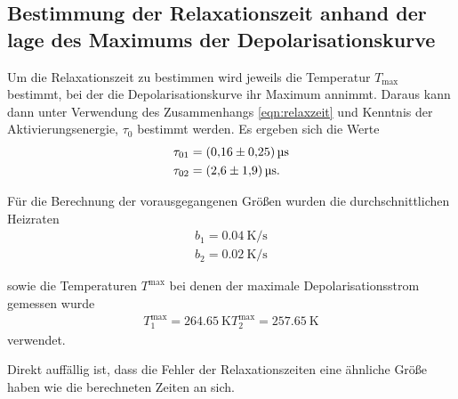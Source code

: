 \subsection{Bestimmung der Relaxationszeit anhand der lage des Maximums der Depolarisationskurve}
\label{subsec:zeit}
Um die Relaxationszeit zu bestimmen wird jeweils die Temperatur $T_\text{max}$ bestimmt, bei der die Depolarisationskurve ihr Maximum annimmt.
Daraus kann dann unter Verwendung des Zusammenhangs \eqref{eqn:relaxzeit} und Kenntnis der Aktivierungsenergie, $\tau_{0}$ bestimmt werden.
Es ergeben sich die Werte
\\
\begin{align*}
  \tau_{01} &= \SI{0.16+-0.25}{\micro\second}\\
  \tau_{02} &= \SI{2.6+-1.9}{\micro\second}.
\end{align*}

Für die Berechnung der vorausgegangenen Größen wurden die durchschnittlichen
Heizraten
\\
\begin{align*}
  b_{1} = \SI{0.04}{\kelvin\per\second}\\
  b_{2} = \SI{0.02}{\kelvin\per\second}
\end{align*}

sowie die Temperaturen $T^\text{max}$ bei denen der maximale Depolarisationsstrom gemessen wurde
\\
\begin{align*}
  T^\text{max}_{1} = \SI{264.65}{\kelvin}
  T^\text{max}_{2} = \SI{257.65}{\kelvin}
\end{align*}
verwendet.

Direkt auffällig ist, dass die Fehler der Relaxationszeiten eine ähnliche
Größe haben wie die berechneten Zeiten an sich.
